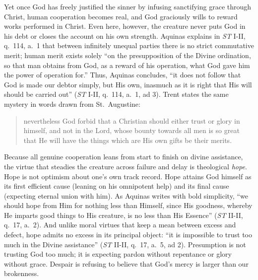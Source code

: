 Yet once God has freely justified the sinner by infusing sanctifying grace through Christ, human cooperation becomes real, and God graciously wills to reward works performed in Christ. Even here, however, the creature never puts God in his debt or closes the account on his own strength. Aquinas explains in \emph{ST} I-II, q.\ 114, a.\ 1 that between infinitely unequal parties there is no strict commutative merit; human merit exists solely ``on the presupposition of the Divine ordination, so that man obtains from God, as a reward of his operation, what God gave him the power of operation for.'' Thus, Aquinas concludes, ``it does not follow that God is made our debtor simply, but His own, inasmuch as it is right that His will should be carried out'' (\emph{ST} I-II, q.\ 114, a.\ 1, ad 3). Trent states the same mystery in words drawn from St.\ Augustine:

\begin{quote}
nevertheless God forbid that a Christian should either trust or glory in himself, and not in the Lord, whose bounty towards all men is so great that He will have the things which are His own gifts be their merits.
\end{quote}

Because all genuine cooperation leans from start to finish on divine assistance, the virtue that steadies the creature across failure and delay is theological \emph{hope}. Hope is not optimism about one's own track record. Hope attains God himself as its first efficient cause (leaning on his omnipotent help) and its final cause (expecting eternal union with him). As Aquinas writes with bold simplicity, ``we should hope from Him for nothing less than Himself, since His goodness, whereby He imparts good things to His creature, is no less than His Essence'' (\emph{ST} II-II, q.\ 17, a.\ 2). And unlike moral virtues that keep a mean between excess and defect, hope admits no excess in its principal object: ``it is impossible to trust too much in the Divine assistance'' (\emph{ST} II-II, q.\ 17, a.\ 5, ad 2). Presumption is not trusting God too much; it is expecting pardon without repentance or glory without grace. Despair is refusing to believe that God's mercy is larger than our brokenness.

